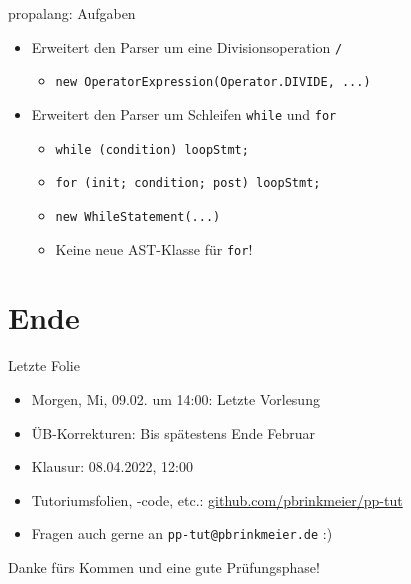 \begin{frame}{propalang: Aufgaben}

  \begin{itemize}
    \item Erweitert den Parser um eine Divisionsoperation \texttt{/}
    \begin{itemize}
      \item \texttt{new OperatorExpression(Operator.DIVIDE, ...)}
    \end{itemize}
    \pause
    \item Erweitert den Parser um Schleifen \texttt{while} und \texttt{for}
    \begin{itemize}
      \item \texttt{while (condition) loopStmt;}
      \item \texttt{for (init; condition; post) loopStmt;}
      \item \texttt{new WhileStatement(...)}
      \item Keine neue AST-Klasse für \texttt{for}!
    \end{itemize}
  \end{itemize}
\end{frame}

\section{Ende}

\begin{frame}{Letzte Folie}
  \begin{itemize}
    \item Morgen, Mi, 09.02. um 14:00: Letzte Vorlesung
    \item ÜB-Korrekturen: Bis spätestens Ende Februar
    \item Klausur: 08.04.2022, 12:00
    \item Tutoriumsfolien, -code, etc.: \href{https://github.com/pbrinkmeier/pp-tut}{github.com/pbrinkmeier/pp-tut}
    \item Fragen auch gerne an \texttt{pp-tut@pbrinkmeier.de} :)
  \end{itemize}

  \vfill

  Danke fürs Kommen und eine gute Prüfungsphase!
\end{frame}
